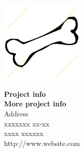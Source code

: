 {}
\thispagestyle{empty}

\begin{minipage}[t]{0.48\textwidth}
\vspace*{-25pt}			%
\includegraphics[height=4cm]{pictures/skeleton-logo.png}
\end{minipage}
\hfill
\begin{minipage}[t]{0.48\textwidth}
{\small 
\textbf{Project info}\\
\textbf{More project info}  \\
Address \\
xxxxxxx xx-xx \\
xxxx xxxxxx \\
http://www.website.com}
\end{minipage}

\vspace*{1cm}

